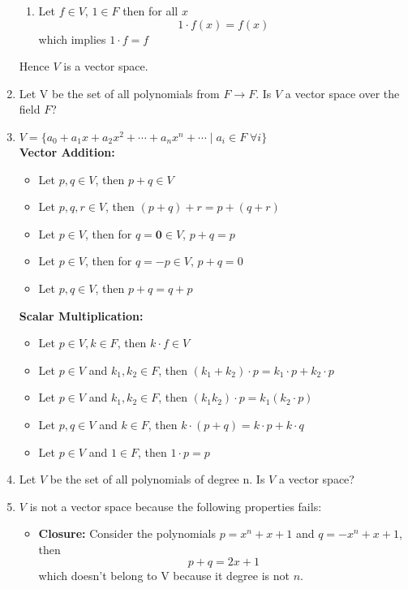 \documentclass[a4paper, titlepage]{article}
\begin{document}
\begin{enumerate}[label=\textbf{\arabic*.}]
\begin{enumerate}[label=\textbf{\alph*}]
            \item Let $f \in V$, $1 \in F$ then for all $x$ 
            $$ 1\cdot f(x) = f(x) $$
            which implies $1\cdot f = f$
        \end{enumerate}
        Hence $V$ is a vector space.
    \item Let V be the set of all polynomials from $F \rightarrow F$.
    Is $V$ a vector space over the field $F$?
    \item[] 
    $V = \{ a_0 + a_1x + a_2x^2 + \cdots + a_nx^n + \cdots \; | \; a_i \in F \; \forall i \} $ \hfill \\
    \textbf{Vector Addition: }
    \begin{itemize}
        \item Let $p, q \in V$, then $p + q \in V$
        \item Let $p, q, r \in V$, then $(p + q) + r = p + (q + r)$
        \item Let $ p \in V $, then for $q = \textbf{0} \in V$, $p + q = p$
        \item Let $ p \in V $, then for $q = -p \in V$, $p + q = 0$
        \item Let $p, q \in V$, then $p + q = q + p$
    \end{itemize}
    \textbf{Scalar Multiplication: }
    \begin{itemize}
        \item Let $p \in V, k \in F$, then $k\cdot f \in V$ 
        \item Let $p \in V$ and $k_ 1, k_2 \in F$, then $(k_1 + k_2)\cdot p = k_1\cdot p +  k_2\cdot p$
        \item Let $p \in V$ and $k_ 1, k_2 \in F$, then $(k_1k_2)\cdot p = k_1(k_2\cdot p)$
        \item Let $p, q \in V$ and $k \in F$, then $k\cdot (p + q) = k\cdot p +  k\cdot q$
        \item Let $p \in V$ and $1 \in F$, then $1\cdot p = p$
    \end{itemize}
    \item Let $V$ be the set of all polynomials of degree n. Is $V$ a vector space?
    \item[] $V$ is not a vector space because the following properties fails:
    \begin{itemize}
        \item \textbf{Closure: } Consider the polynomials 
        $p = x^n + x + 1$ and $q = -x^n + x + 1$, then
        $$ p + q = 2x + 1 $$
        which doesn't belong to V because it degree is not $n$.

\end{itemize}
\end{enumerate}
\end{document}
